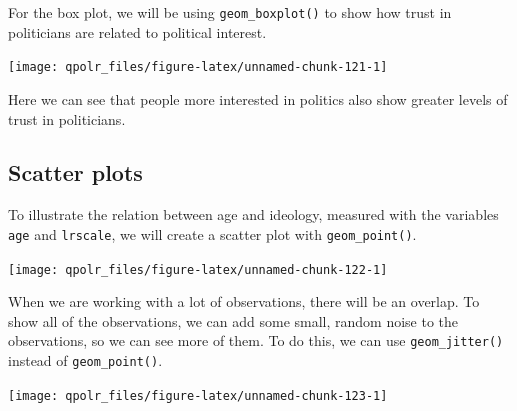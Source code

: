 \documentclass[12pt,oneside]{reedthesis}
\theoremstyle{definition}
\theoremstyle{definition}
\theoremstyle{definition}
\theoremstyle{remark}
\begin{document}
  For the box plot, we will be using \texttt{geom\_boxplot()} to show how
  trust in politicians are related to political interest.
  \begin{Shaded}
  \begin{Highlighting}[]
  \NormalTok{(}\OperatorTok{+}
  \StringTok{  }\NormalTok{() }
  \end{Highlighting}
  \end{Shaded}
  \begin{center}\texttt{[image: qpolr\_files/figure-latex/unnamed-chunk-121-1]} \end{center}
  
  Here we can see that people more interested in politics also show
  greater levels of trust in politicians.
  
  \subsection{Scatter plots}\label{scatter-plots}
  
  To illustrate the relation between age and ideology, measured with the
  variables \texttt{age} and \texttt{lrscale}, we will create a scatter
  plot with \texttt{geom\_point()}.
  \begin{Shaded}
  \begin{Highlighting}[]
  \NormalTok{(}\OperatorTok{+}
  \StringTok{  }\NormalTok{() }
  \end{Highlighting}
  \end{Shaded}
  \begin{center}\texttt{[image: qpolr\_files/figure-latex/unnamed-chunk-122-1]} \end{center}
  
  When we are working with a lot of observations, there will be an
  overlap. To show all of the observations, we can add some small, random
  noise to the observations, so we can see more of them. To do this, we
  can use \texttt{geom\_jitter()} instead of \texttt{geom\_point()}.
  \begin{Shaded}
  \begin{Highlighting}[]
  \NormalTok{(}\OperatorTok{+}
  \StringTok{  }\NormalTok{() }
  \end{Highlighting}
  \end{Shaded}
  \begin{center}\texttt{[image: qpolr\_files/figure-latex/unnamed-chunk-123-1]} \end{center}
  
\end{document}
